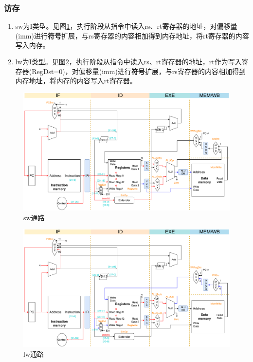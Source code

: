 \subsubsection{访存}
\begin{enumerate}
	\item sw为I类型。见图\ref{fig:datapath_sw}，执行阶段从指令中读入rs、rt寄存器的地址，对偏移量(imm)进行\textbf{符号}扩展，与rs寄存器的内容相加得到内存地址，将rt寄存器的内容写入内存。
	\item lw为I类型。见图\ref{fig:datapath_lw}，执行阶段从指令中读入rs、rt寄存器的地址，rt作为写入寄存器(RegDst=0)，对偏移量(imm)进行\textbf{符号}扩展，与rs寄存器的内容相加得到内存地址，将内存的内容写入rt寄存器。
\end{enumerate}
\begin{figure}[H]
\centering
\includegraphics[width=\linewidth]{fig/Datapath-sw.pdf}
\caption{sw通路}
\label{fig:datapath_sw}
\end{figure}
\begin{figure}[H]
\centering
\includegraphics[width=\linewidth]{fig/Datapath-lw.pdf}
\caption{lw通路}
\label{fig:datapath_lw}
\end{figure}

